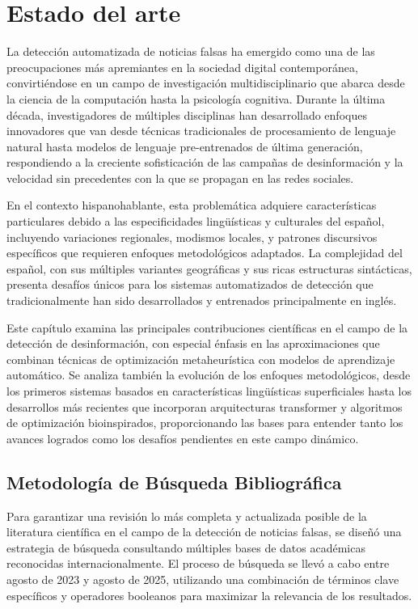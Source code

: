 \chapter{Estado del arte \label{cap:EstadoDelArte}}

La detección automatizada de noticias falsas ha emergido como una de las preocupaciones más apremiantes en la sociedad digital contemporánea, convirtiéndose en un campo de investigación multidisciplinario que abarca desde la ciencia de la computación hasta la psicología cognitiva. Durante la última década, investigadores de múltiples disciplinas han desarrollado enfoques innovadores que van desde técnicas tradicionales de procesamiento de lenguaje natural hasta modelos de lenguaje pre-entrenados de última generación, respondiendo a la creciente sofisticación de las campañas de desinformación y la velocidad sin precedentes con la que se propagan en las redes sociales.

En el contexto hispanohablante, esta problemática adquiere características particulares debido a las especificidades lingüísticas y culturales del español, incluyendo variaciones regionales, modismos locales, y patrones discursivos específicos que requieren enfoques metodológicos adaptados. La complejidad del español, con sus múltiples variantes geográficas y sus ricas estructuras sintácticas, presenta desafíos únicos para los sistemas automatizados de detección que tradicionalmente han sido desarrollados y entrenados principalmente en inglés.

Este capítulo examina las principales contribuciones científicas en el campo de la detección de desinformación, con especial énfasis en las aproximaciones que combinan técnicas de optimización metaheurística con modelos de aprendizaje automático. Se analiza también la evolución de los enfoques metodológicos, desde los primeros sistemas basados en características lingüísticas superficiales hasta los desarrollos más recientes que incorporan arquitecturas transformer y algoritmos de optimización bioinspirados, proporcionando las bases para entender tanto los avances logrados como los desafíos pendientes en este campo dinámico.

\section{Metodología de Búsqueda Bibliográfica}
\label{sec:busqueda_literatura}

Para garantizar una revisión lo más completa y actualizada posible de la literatura científica en el campo de la detección de noticias falsas, se diseñó una estrategia de búsqueda consultando múltiples bases de datos académicas reconocidas internacionalmente. El proceso de búsqueda se llevó a cabo entre agosto de 2023 y agosto de 2025, utilizando una combinación de términos clave específicos y operadores booleanos para maximizar la relevancia de los resultados.


